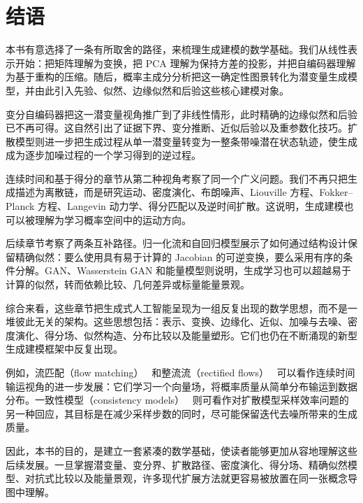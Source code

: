 \chapter*{结语}

本书有意选择了一条有所取舍的路径，来梳理生成建模的数学基础。我们从线性表示开始：把矩阵理解为变换，把 PCA 理解为保持方差的投影，并把自编码器理解为基于重构的压缩。随后，概率主成分分析把这一确定性图景转化为潜变量生成模型，并由此引入先验、似然、边缘似然和后验这些核心建模对象。

变分自编码器把这一潜变量视角推广到了非线性情形，此时精确的边缘似然和后验已不再可得。这自然引出了证据下界、变分推断、近似后验以及重参数化技巧。扩散模型则进一步把生成过程从单一潜变量转变为一整条带噪潜在状态轨迹，使生成成为逐步加噪过程的一个学习得到的逆过程。

连续时间和基于得分的章节从第二种视角考察了同一个广义问题。我们不再只把生成描述为离散链，而是研究运动、密度演化、布朗噪声、Liouville 方程、Fokker--Planck 方程、Langevin 动力学、得分匹配以及逆时间扩散。这说明，生成建模也可以被理解为学习概率空间中的运动方向。

后续章节考察了两条互补路径。归一化流和自回归模型展示了如何通过结构设计保留精确似然：要么使用具有易于计算的 Jacobian 的可逆变换，要么采用有序的条件分解。GAN、Wasserstein GAN 和能量模型则说明，生成学习也可以超越易于计算的似然，转而依赖比较、几何差异或标量能量景观。

综合来看，这些章节把生成式人工智能呈现为一组反复出现的数学思想，而不是一堆彼此无关的架构。这些思想包括：表示、变换、边缘化、近似、加噪与去噪、密度演化、得分场、似然构造、分布比较以及能量塑形。它们也仍在不断涌现的新型生成建模框架中反复出现。

例如，流匹配（flow matching）~\cite{lipman2023flow} 和整流流（rectified flows）~\cite{liu2022rectified} 可以看作连续时间输运视角的进一步发展：它们学习一个向量场，将概率质量从简单分布输运到数据分布。一致性模型（consistency models）~\cite{song2023consistency} 则可看作对扩散模型采样效率问题的另一种回应，其目标是在减少采样步数的同时，尽可能保留迭代去噪所带来的生成质量。

因此，本书的目的，是建立一套紧凑的数学基础，使读者能够更加从容地理解这些后续发展。一旦掌握潜变量、变分界、扩散路径、密度演化、得分场、精确似然模型、对抗式比较以及能量景观，许多现代扩展方法就更容易被放置在同一张概念导图中理解。
